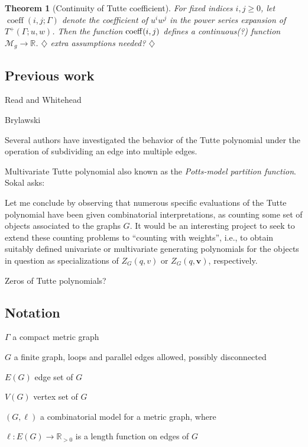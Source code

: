 \documentclass{amsart}
\newtheorem{thm}{Theorem}
\theoremstyle{definition}
\newcommand{\RR}{\mathbb{R}}
\DeclareMathOperator{\coeff}{coeff}
\newcommand{\harry}[1]{{\color{red} \sf $\diamondsuit$  {#1} $\diamondsuit$ }}
\newcommand{\note}[1]{\harry{#1}}
\begin{document}
\begin{thm}[Continuity of Tutte coefficient]
For fixed indices $i,j\geq 0$,
let $\coeff(i,j; \Gamma)$
denote the coefficient of $u^i w^j$ in the power series expansion of $T^+(\Gamma; u,w)$.
Then the function ${\rm coeff}(i,j)$
defines a continuous(?) 
function $\mathcal M_g \to \RR$.
\note{extra assumptions needed?}
\end{thm}

\subsection{Previous work} 

Read and Whitehead \cite{RW2}

Brylawski \cite{Bry}

Several authors have investigated the behavior of the Tutte polynomial under the operation of subdividing an edge into multiple edges.

\cite{Tra1,Tra2,Tra3}

\cite{RW1,RW2}

Multivariate Tutte polynomial \cite{Sok-potts}
also known as the {\em Potts-model partition function}.
Sokal \cite{Sok-potts} asks:
\begin{displayquote}
Let me conclude by observing that numerous specific evaluations of the Tutte polynomial have been given combinatorial interpretations, 
as counting some set of objects associated to the graphs $G$. 
It would be an interesting project to seek to extend these counting problems to ``counting with weights'',
i.e., to obtain suitably defined univariate or multivariate generating polynomials for the objects in question as specializations of 
$Z_G(q,v)$ or $Z_G(q,\mathbf{v})$, respectively.
\end{displayquote}
Zeros of Tutte polynomials?

\subsection{Notation}

$\Gamma$ a compact metric graph

$G$ a finite graph, 
loops and parallel edges allowed,
possibly disconnected

$E(G)$ edge set of $G$

$V(G)$ vertex set of $G$

$(G,\ell)$ a combinatorial model for a metric graph,
where 

$\ell : E(G) \to \RR_{>0}$
is a length function on edges of $G$
\end{document}
